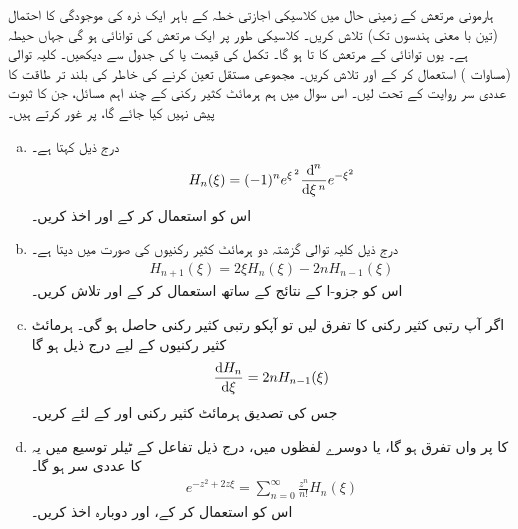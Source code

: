 ہارمونی مرتعش کے زمینی حال میں کلاسیکی اجازتی خطہ کے باہر ایک ذرہ کی موجودگی کا احتمال (تین با معنی ہندسوں تک) تلاش کریں۔
 کلاسیکی طور پر ایک مرتعش کی توانائی  ہو گی جہاں  حیطہ ہے۔ یوں توانائی  کے مرتعش کا   تا  ہو گا۔ تکمل کی قیمت  یا  کی جدول سے دیکھیں۔
%
کلیہ توالی (مساوات ) استعمال کر کے  اور 
تلاش کریں۔ مجموعی مستقل تعین کرنے کی خاطر  کی بلند تر طاقت کا عددی سر روایت کے تحت  لیں۔
%
اس سوال میں ہم ہرمائٹ کثیر رکنی کے چند اہم مسائل، جن کا ثبوت پیش نہیں کیا جائے گا، پر غور کرتے ہیں۔
\begin{enumerate}[a.]
\item
{} درج ذیل کہتا ہے۔
\begin{align}
H_{n}(\xi)=(-1)^{n}e^{\xi^{\,2}}\frac{\dif^{\,n} }{\dif \xi^{\,n}}e^{-\xi^{2}}
\end{align}
اس کو استعمال کر کے  اور  اخذ کریں۔
\item
درج ذیل کلیہ توالی گزشتہ دو ہرمائٹ کثیر رکنیوں کی صورت میں  دیتا ہے۔
\begin{align}
H_{n+1}(\xi)=2\xi H_{n}(\xi)-2nH_{n-1}(\xi)
\end{align}
اس کو جزو-ا کے نتائج کے ساتھ استعمال کر کے  اور  تلاش کریں۔
\item
اگر آپ  رتبی کثیر رکنی کا تفرق لیں تو آپکو  رتبی کثیر رکنی حاصل ہو گی۔ ہرمائٹ کثیر رکنیوں کے لیے درج ذیل ہو گا
\begin{align}
\frac{\dif{H_{n}}}{\dif{\xi}}=2nH_{n-1}(\xi)
\end{align}
جس کی تصدیق ہرمائٹ کثیر رکنی  اور  کے لئے کریں۔ 
\item
{}  کا  پر  واں تفرق  ہو گا، یا دوسرے لفظوں میں، درج ذیل تفاعل کے ٹیلر توسیع میں یہ
 کا عددی سر ہو گا۔
\begin{align}
e^{-z^{2}+2z\xi}=\sum_{n=0}^{\infty}\frac{z^{n}}{n!}H_{n}(\xi)
\end{align}
اس کو استعمال کر کے،  اور  دوبارہ اخذ کریں۔
\end{enumerate}

